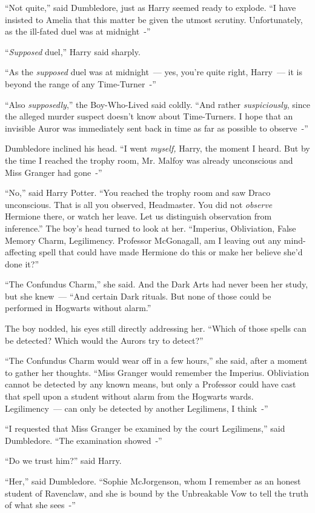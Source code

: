 ``Not quite,'' said Dumbledore, just as Harry seemed ready to explode. ``I have insisted to Amelia that this matter be given the utmost scrutiny. Unfortunately, as the ill-fated duel was at midnight~-''

``\emph{Supposed} duel,'' Harry said sharply.

``As the \emph{supposed} duel was at midnight~--- yes, you're quite right, Harry~--- it is beyond the range of any Time-Turner~-''

``Also \emph{supposedly},'' the Boy-Who-Lived said coldly. ``And rather \emph{suspiciously}, since the alleged murder suspect doesn't know about Time-Turners. I hope that an invisible Auror was immediately sent back in time as far as possible to observe~-''

Dumbledore inclined his head. ``I went \emph{myself,} Harry, the moment I heard. But by the time I reached the trophy room, Mr. Malfoy was already unconscious and Miss Granger had gone~-''

``No,'' said Harry Potter. ``You reached the trophy room and saw Draco unconscious. That is all you observed, Headmaster. You did not \emph{observe} Hermione there, or watch her leave. Let us distinguish observation from inference.'' The boy's head turned to look at her. ``Imperius, Obliviation, False Memory Charm, Legilimency. Professor McGonagall, am I leaving out any mind-affecting spell that could have made Hermione do this or make her believe she'd done it?''

``The Confundus Charm,'' she said. And the Dark Arts had never been her study, but she knew~--- ``And certain Dark rituals. But none of those could be performed in Hogwarts without alarm.''

The boy nodded, his eyes still directly addressing her. ``Which of those spells can be detected? Which would the Aurors try to detect?''

``The Confundus Charm would wear off in a few hours,'' she said, after a moment to gather her thoughts. ``Miss Granger would remember the Imperius. Obliviation cannot be detected by any known means, but only a Professor could have cast that spell upon a student without alarm from the Hogwarts wards. Legilimency~--- can only be detected by another Legilimens, I think~-''

``I requested that Miss Granger be examined by the court Legilimens,'' said Dumbledore. ``The examination showed~-''

``Do we trust him?'' said Harry.

``Her,'' said Dumbledore. ``Sophie McJorgenson, whom I remember as an honest student of Ravenclaw, and she is bound by the Unbreakable Vow to tell the truth of what she sees~-''

